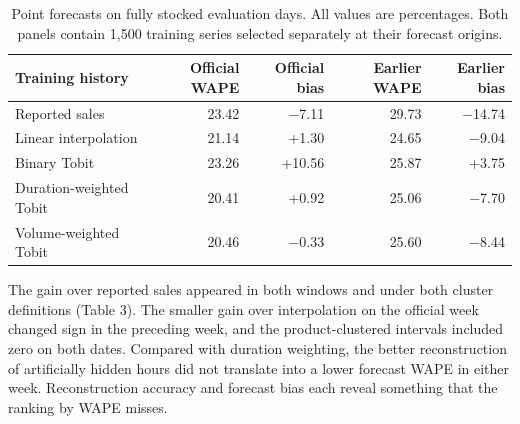 \documentclass[11pt,a4paper]{article}
\begin{document}
\begin{table}[htbp]\centering\small
\caption{Point forecasts on fully stocked evaluation days. All values are percentages. Both panels contain 1,500 training series selected separately at their forecast origins.}


\begin{tabular}{@{}lrrrr@{}}\toprule

Training history & Official WAPE & Official bias & Earlier WAPE & Earlier bias \\

\midrule

Reported sales & 23.42 & \ensuremath{-}7.11 & 29.73 & \ensuremath{-}14.74 \\

Linear interpolation & 21.14 & +1.30 & 24.65 & \ensuremath{-}9.04 \\

Binary Tobit & 23.26 & +10.56 & 25.87 & +3.75 \\

Duration-weighted Tobit & 20.41 & +0.92 & 25.06 & \ensuremath{-}7.70 \\

Volume-weighted Tobit & 20.46 & \ensuremath{-}0.33 & 25.60 & \ensuremath{-}8.44 \\

\bottomrule\end{tabular}\end{table}

The gain over reported sales appeared in both windows and under both cluster definitions (Table 3). The smaller gain over interpolation on the official week changed sign in the preceding week, and the product-clustered intervals included zero on both dates. Compared with duration weighting, the better reconstruction of artificially hidden hours did not translate into a lower forecast WAPE in either week. Reconstruction accuracy and forecast bias each reveal something that the ranking by WAPE misses.
\end{document}
